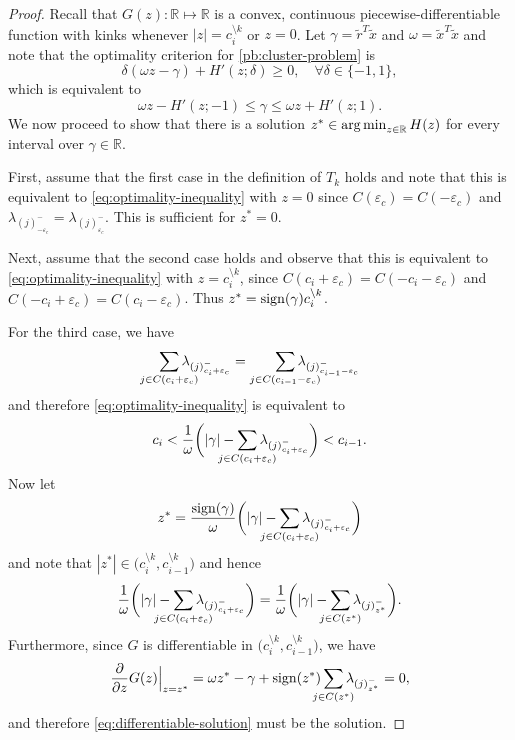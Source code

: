 \begin{proof}
  Recall that \(G(z) : \mathbb{R} \mapsto \mathbb{R}\) is a convex,
  continuous piecewise-differentiable function with kinks whenever \(|z| =
  c_i^{\setminus k}\) or \(z = 0\). Let \(\gamma = \tilde{r}^T\tilde{x}\)
  and \(\omega = \tilde{x}^T\tilde{x}\) and note that the optimality criterion for
  \eqref{pb:cluster-problem} is
  \[
    \delta(\omega z - \gamma) + H'(z; \delta) \geq 0, \quad
    \forall \delta \in \{-1, 1\},
  \]
  which is equivalent to
  \begin{equation}
    \label{eq:optimality-inequality}
    \omega z - H'(z; -1) \leq \gamma \leq \omega z + H'(z; 1).
  \end{equation}
  We now proceed to show that there is a solution \(z^* \in \operatorname*{arg\,min}_{z \in
    \mathbb{R}} H(z)\) for every interval over \(\gamma \in \mathbb{R}\).

  First, assume that the first case in the definition of \(T_k\) holds
  and note that this is equivalent to \eqref{eq:optimality-inequality} with \(z
  = 0\) since \(C({\varepsilon_c}) = C(-{\varepsilon_c})\) and
  \(\lambda_{(j)^-_{-{\varepsilon_c}}} = \lambda_{(j)^-_{{\varepsilon_c}}}\).
  This is sufficient for \(z^* = 0\).

  Next, assume that the second case holds and observe that this is equivalent
  to \eqref{eq:optimality-inequality} with
  \(z = c_i^{\setminus k}\), since
  \(C(c_i + {\varepsilon_c}) = C(-c_i - {\varepsilon_c})\) and
  \(C(-c_i + {\varepsilon_c}) = C(c_i - {\varepsilon_c})\). Thus \(z^* =
  \operatorname{sign}(\gamma)c_i^{\setminus k}\).

  For the third case, we have
  \[
    \smashoperator{\sum_{j \in C(c_i + {\varepsilon_c})}} \lambda_{(j)^-_{c_i + {\varepsilon_c}}}
    =
    \smashoperator[r]{\sum_{j \in C(c_{i-1} - {\varepsilon_c})}} \lambda_{(j)^-_{c_{i-1} - {\varepsilon_c}}}
  \]
  and therefore \eqref{eq:optimality-inequality} is equivalent to
  \[
    c_i < \frac{1}{\omega} \bigg( |\gamma| - \smashoperator{\sum_{j \in C(c_i + {\varepsilon_c})}} \lambda_{(j)^-_{c_i + {\varepsilon_c}}} \bigg) < c_{i -1}.
  \]
  Now let
  \begin{equation}
    \label{eq:differentiable-solution}
    z^* = \frac{\sign(\gamma)}{\omega} \bigg( |\gamma| - \smashoperator{\sum_{j \in C(c_i + {\varepsilon_c})}} \lambda_{(j)^-_{c_i + {\varepsilon_c}}} \bigg)
  \end{equation}
  and note that \(|z^*| \in \big(c_i^{\setminus k}, c_{i-1}^{\setminus k}\big)\) and hence
  \[
    \frac{1}{\omega} \bigg( |\gamma| - \smashoperator{\sum_{j \in C(c_i + {\varepsilon_c})}} \lambda_{(j)^-_{c_i + {\varepsilon_c}}} \bigg)
    =
    \frac{1}{\omega} \bigg( |\gamma| - \smashoperator{\sum_{j \in C(z^*)}} \lambda_{(j)^-_{z^*}} \bigg).
  \]
  Furthermore, since \(G\) is differentiable in \(\big(c_i^{\setminus k}, c_{i-1}^{\setminus k}\big)\), we have
  \[
    \frac{\partial}{\partial z} G(z) \Big|_{z = z^*}
    = \omega z^* - \gamma + \sign(z^*) \smashoperator{\sum_{j \in C(z^*)}} \lambda_{(j)^-_{z^*}} = 0,
  \]
  and therefore \eqref{eq:differentiable-solution} must be the solution.


\end{proof}
